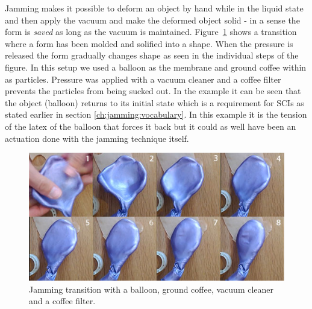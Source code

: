 Jamming makes it possible to deform an object by hand while in the liquid state and then apply the vacuum and make the deformed object solid - in a sense the form is \emph{saved} as long as the vacuum is maintained.
Figure~\ref{fig:ch:jamming:jamming-transition} shows a transition where a form has been molded and solified into a shape.
When the pressure is released the form gradually changes shape as seen in the individual steps of the figure.
In this setup we used a balloon as the membrane and ground coffee within as particles.
Pressure was applied with a vacuum cleaner and a coffee filter prevents the particles from being sucked out.
In the example it can be seen that the object (balloon) returns to its initial state which is a requirement for SCIs as stated earlier in section \ref{ch:jamming:vocabulary}.
In this example it is the tension of the latex of the balloon that forces it back but it could as well have been an actuation done with the jamming technique itself. 

\begin{figure}[h]
  \centering
      \includegraphics[width=.9\textwidth]{figures/jamming/jamming-transition}
  \caption[A jamming transition setup.]
   {Jamming transition with a balloon, ground coffee, vacuum cleaner and a coffee filter.}
   \label{fig:ch:jamming:jamming-transition}
\end{figure}

